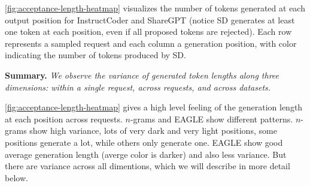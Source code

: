 \autoref{fig:acceptance-length-heatmap} visualizes the number of tokens generated at each output position for InstructCoder and ShareGPT (notice SD generates at least one token at each position, even if all proposed tokens are rejected). Each row represents a sampled request and each column a generation position, with color indicating the number of tokens produced by SD. 

\begin{quoting}[leftmargin=1.5em, rightmargin=1.5em, vskip=0pt]
\textbf{Summary.}
\emph{We observe the variance of generated token lengths along three dimensions: within a single request, across requests, and across datasets.}
\end{quoting}
\autoref{fig:acceptance-length-heatmap} gives a high level feeling of the generation length at each position across requests. $n$-grams and EAGLE show different patterns. $n$-grams show high variance, lots of very dark and very light positions, some positions generate a lot, while others only generate one. EAGLE show good average generation length (averge color is darker) and also less variance. But there are variance across all dimentions, which we will describe in more detail below. 





